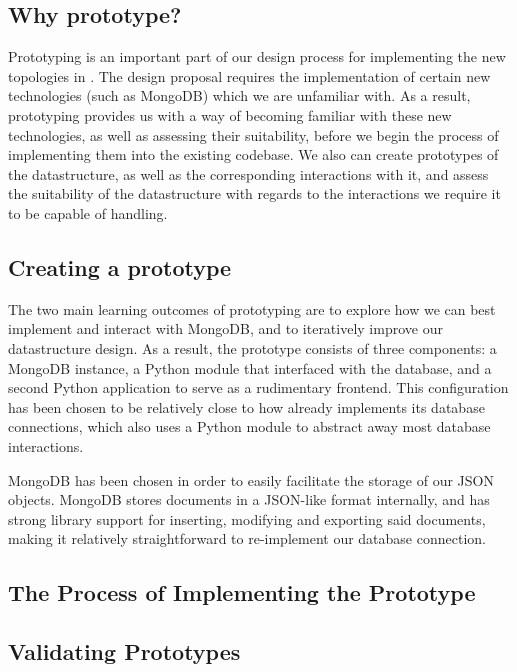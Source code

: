 \documentclass[11pt]{article}
\begin{document}
	\subsection{Why prototype?}
		Prototyping is an important part of our design process for implementing the new topologies in \opendc{}.
		The design proposal requires the implementation of certain new technologies (such as MongoDB) which we are unfamiliar with.
		As a result, prototyping provides us with a way of becoming familiar with these new technologies, as well as assessing their suitability, before we begin the process of implementing them into the existing \opendc{} codebase.
		We also can create prototypes of the datastructure, as well as the corresponding interactions with it, and assess the suitability of the datastructure with regards to the interactions we require it to be capable of handling.
	
	\subsection{Creating a prototype}
		The two main learning outcomes of prototyping are to explore how we can best implement and interact with MongoDB, and to iteratively improve our datastructure design.
		As a result, the prototype consists of three components: a MongoDB instance, a Python module that interfaced with the database, and a second Python application to serve as a rudimentary frontend. 
		This configuration has been chosen to be relatively close to how \opendc{} already implements its database connections, which also uses a Python module to abstract away most database interactions.

		MongoDB has been chosen in order to easily facilitate the storage of our JSON objects.
		MongoDB stores documents in a JSON-like format internally, and has strong library support for inserting, modifying and exporting said documents, making it relatively straightforward to re-implement our database connection.
	
	\subsection{The Process of Implementing the Prototype}
	\subsection{Validating Prototypes}
\end{document}
